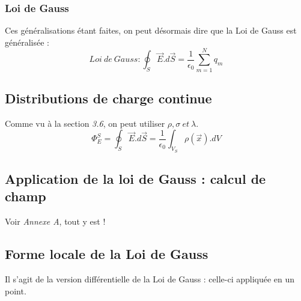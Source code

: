 \documentclass	[11pt, a4paper, openany]{book}
\begin{document}
\subsubsection{Loi de Gauss}
Ces généralisations étant faites, on peut désormais dire que la Loi de Gauss est généralisée :
\begin{equation}
Loi\ de\ Gauss : \oint_S \vec{E}.d\vec{S} = \dfrac{1}{\epsilon_0}\sum_{m=1}^N q_m
\end{equation}

\subsection{Distributions de charge continue}
Comme vu à la section \textit{3.6}, on peut utiliser $\rho, \sigma\ et\ \lambda$.
\begin{equation}
\Phi^S_E = \oint_S \vec{E}.d\vec{S} = \frac{1}{\epsilon_0}\int_{V_S}\rho(\vec x).dV
\end{equation}

\subsection{Application de la loi de Gauss : calcul de champ}
Voir \textit{Annexe A}, tout y est !
\newpage
\subsection{Forme locale de la Loi de Gauss}
Il s'agit de la version différentielle de la Loi de Gauss : celle-ci appliquée en un point.
\end{document}

